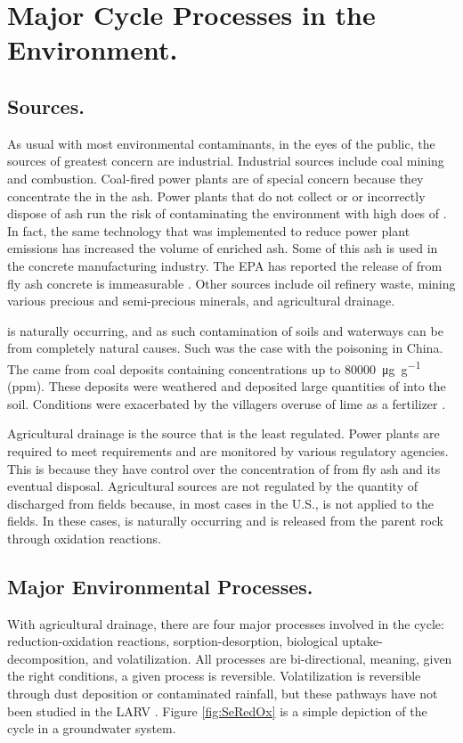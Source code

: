 \section{Major \Se Cycle Processes in the Environment.}
\label{sec:major processes}

\subsection*{\Se Sources.}
As usual with most environmental contaminants, in the eyes of the public, the sources of greatest concern are industrial.  Industrial sources include coal mining and combustion.  Coal-fired power plants are of special concern because they concentrate the \Se in the ash.  Power plants that do not collect or or incorrectly dispose of ash run the risk of contaminating the environment with high does of \Se \parencite{Lemly2002}.  In fact, the same technology that was implemented to reduce power plant emissions has increased the volume of \Se enriched ash.  Some of this ash is used in the concrete manufacturing industry.  The EPA has reported the release of \Se from fly ash concrete is immeasurable \parencite{EPA2014}.  Other sources include oil refinery waste, mining various precious and semi-precious minerals, and agricultural drainage.

\Se is naturally occurring, and as such contamination of soils and waterways can be from completely natural causes.  Such was the case with the \Se poisoning in China.  The \Se came from coal deposits containing \Se concentrations up to \SI{80000}{\micro\g\per\g} (ppm).  These deposits were weathered and deposited large quantities of \Se into the soil.   Conditions were exacerbated by the villagers overuse of lime as a fertilizer \parencite{yang1983}.

Agricultural drainage is the \Se source that is the least regulated.  Power plants are required to meet requirements and are monitored by various regulatory agencies.  This is because they have control over the concentration of \Se from fly ash and its eventual disposal.  Agricultural sources are not regulated by the quantity of \Se discharged from fields because, in most cases in the U.S., \Se is not applied to the fields.  In these cases, \Se is naturally occurring and is released from the parent rock through oxidation reactions.  

\subsection*{Major Environmental Processes.}
With agricultural drainage, there are four major processes involved in the \Se cycle: reduction-oxidation reactions, sorption-desorption, biological uptake-decomposition, and volatilization.  All processes are bi-directional, meaning, given the right conditions, a given process is reversible.  Volatilization is reversible through \Se dust deposition or \Se contaminated rainfall, but these pathways have not been studied in the LARV \parencite{Lawson2001}.  Figure \ref{fig:SeRedOx} is a simple depiction of the \Se cycle in a groundwater system.

